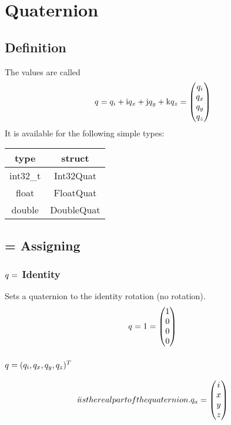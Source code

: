 \section{Quaternion}
\subsection{Definition}
The values are called
\begin{equation}
q_{} = q_i + \mathrm{i} q_x + \mathrm{j} q_y + \mathrm{k} q_z
 = \begin{pmatrix} q_i \\q_x\\q_y\\q_z\end{pmatrix}
\end{equation}
It is available for the following simple types:\\
\begin{tabular}{c|c}
type		& struct		\\ \hline
int32\_t	& Int32Quat		\\
float		& FloatQuat		\\
double		& DoubleQuat		
\end{tabular}




\subsection{= Assigning}
\subsubsection*{$q_{} = $ Identity}
Sets a quaternion to the identity rotation (no rotation).
\begin{equation}
q_{} = 1 = \begin{pmatrix}1 \\ 0 \\0\\0\end{pmatrix}
\end{equation}

\subsubsection*{$q_{} = (q_{i},q_{x},q_{y},q_{z})^{T}$}
\begin{equation}
\textit{i} is the real part of the quaternion.
 q_{a} = \begin{pmatrix}i\\ x \\ y \\ z \end{pmatrix}
\end{equation}

